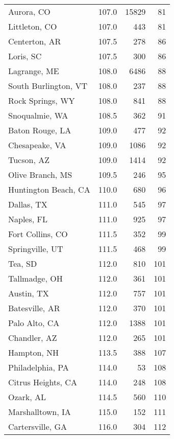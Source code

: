 \begin{longtable}{lrrr}
Aurora, CO           &   107.0 &  15829 &    81 \\
Littleton, CO        &   107.0 &    443 &    81 \\
Centerton, AR        &   107.5 &    278 &    86 \\
Loris, SC            &   107.5 &    300 &    86 \\
Lagrange, ME         &   108.0 &   6486 &    88 \\
South Burlington, VT &   108.0 &    237 &    88 \\
Rock Springs, WY     &   108.0 &    841 &    88 \\
Snoqualmie, WA       &   108.5 &    362 &    91 \\
Baton Rouge, LA      &   109.0 &    477 &    92 \\
Chesapeake, VA       &   109.0 &   1086 &    92 \\
Tucson, AZ           &   109.0 &   1414 &    92 \\
Olive Branch, MS     &   109.5 &    246 &    95 \\
Huntington Beach, CA &   110.0 &    680 &    96 \\
Dallas, TX           &   111.0 &    545 &    97 \\
Naples, FL           &   111.0 &    925 &    97 \\
Fort Collins, CO     &   111.5 &    352 &    99 \\
Springville, UT      &   111.5 &    468 &    99 \\
Tea, SD              &   112.0 &    810 &   101 \\
Tallmadge, OH        &   112.0 &    361 &   101 \\
Austin, TX           &   112.0 &    757 &   101 \\
Batesville, AR       &   112.0 &    370 &   101 \\
Palo Alto, CA        &   112.0 &   1388 &   101 \\
Chandler, AZ         &   112.0 &    265 &   101 \\
Hampton, NH          &   113.5 &    388 &   107 \\
Philadelphia, PA     &   114.0 &     53 &   108 \\
Citrus Heights, CA   &   114.0 &    248 &   108 \\
Ozark, AL            &   114.5 &    560 &   110 \\
Marshalltown, IA     &   115.0 &    152 &   111 \\
Cartersville, GA     &   116.0 &    304 &   112 \\

\end{longtable}
